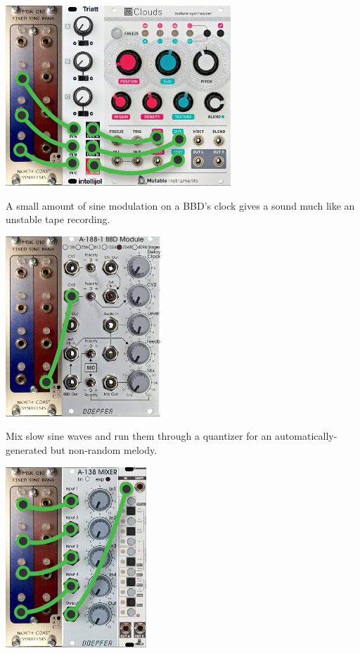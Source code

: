 {\hspace*{\fill}\includegraphics[scale=0.8]{patch2.png}\hspace*{\fill}\par} 

\newpage

A small amount of sine modulation on a BBD's clock gives a sound much
like an unstable tape recording.

{\hspace*{\fill}\includegraphics[scale=0.8]{patch3.png}\hspace*{\fill}\par} 

Mix slow sine waves and run them through a quantizer for an
automatically-generated but non-random melody.

{\hspace*{\fill}\includegraphics[scale=0.8]{patch4.png}\hspace*{\fill}\par} 
